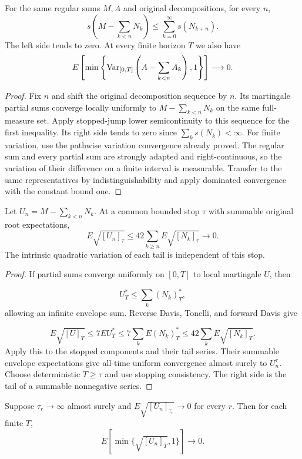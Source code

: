 \begin{lemma}
For the same regular sums $M,A$ and original decompositions, for every $n$,
\[
 s\left(M-\sum_{k<n}N_k\right)\leq\sum_{k=0}^{\infty}s(N_{k+n}).
\]
The left side tends to zero. At every finite horizon $T$ we also have
\[
 E\left[\min\left\{\operatorname{Var}_{[0,T]}
       \left(A-\sum_{k<n}A_k\right),1\right\}\right]\longrightarrow0.
\]
\end{lemma}
\begin{proof}
Fix $n$ and shift the original decomposition sequence by $n$.
Its martingale partial sums converge locally uniformly to
$M-\sum_{k<n}N_k$ on the same full-measure set.
Apply stopped-jump lower semicontinuity to this sequence for the first
inequality. Its right side tends to zero since $\sum_ks(N_k)<\infty$.
For finite variation, use the pathwise variation convergence already proved.
The regular sum and every partial sum are strongly adapted and
right-continuous, so the variation of their difference on a finite interval
is measurable. Transfer to the same representatives by indistinguishability
and apply dominated convergence with the constant bound one.
\end{proof}
\begin{lemma}
Let $U_n=M-\sum_{k<n}N_k$. At a common bounded stop $\tau$ with summable
original root expectations,
\[
 E\sqrt{[U_n]_\tau}\leq42\sum_{k\geq n}E\sqrt{[N_k]_\tau}\longrightarrow0.
\]
The intrinsic quadratic variation of each tail is independent of this stop.
\end{lemma}
\begin{proof}
If partial sums converge uniformly on $[0,T]$ to local martingale $U$, then

\[
 U_T^*\leq\sum_k(N_k)_T^*,
\] allowing an infinite envelope sum.
Reverse Davis, Tonelli, and forward Davis give

\[
 E\sqrt{[U]_T}\leq7EU_T^*\leq7\sum_kE(N_k)_T^*
\leq42\sum_kE\sqrt{[N_k]_T}.
\]
Apply this to the stopped components and their tail series. Their summable
envelope expectations give all-time uniform convergence almost surely to
$U_n^\tau$. Choose deterministic $T\geq\tau$ and use stopping consistency.
The right side is the tail of a summable nonnegative series.
\end{proof}
\begin{lemma}
Suppose $\tau_r\to\infty$ almost surely and
$E\sqrt{[U_n]_{\tau_r}}\to0$ for every $r$. Then for each finite $T$,
\[
 E[\min\{\sqrt{[U_n]_T},1\}]\longrightarrow0.
\]
\end{lemma}
